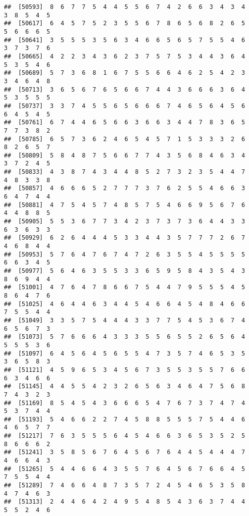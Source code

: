 \documentclass[
]{book}
\begin{document}
\begin{verbatim}
##  [50593]  8  6  7  7  5  4  4  5  5  6  7  4  2  6  6  3  4  3  4  3  8  5  4  5
##  [50617]  6  4  5  7  5  2  3  5  5  6  7  8  6  5  6  8  2  6  5  5  6  6  6  5
##  [50641]  3  5  5  5  3  5  6  3  4  6  6  5  6  5  7  5  5  4  6  3  7  3  7  6
##  [50665]  4  2  2  3  4  3  6  2  3  7  5  7  5  3  4  4  3  6  4  5  3  5  4  6
##  [50689]  5  7  3  6  8  1  6  7  5  5  6  6  4  6  2  5  4  2  3  3  4  6  4  8
##  [50713]  3  6  5  6  7  6  5  6  6  7  4  4  3  6  6  6  3  6  4  5  3  5  5  5
##  [50737]  3  3  7  4  5  5  6  5  6  6  6  7  4  6  5  6  4  5  6  6  4  5  4  5
##  [50761]  6  7  4  4  6  5  6  6  3  6  6  3  4  4  7  8  3  6  5  7  7  3  8  2
##  [50785]  6  5  7  3  6  2  4  6  5  4  5  7  1  5  3  3  3  2  6  8  2  6  5  7
##  [50809]  5  8  4  8  7  5  6  6  7  7  4  3  5  6  8  4  6  3  4  3  7  2  4  5
##  [50833]  4  3  8  7  4  3  4  4  8  5  2  7  3  2  3  5  4  4  7  4  8  3  3  8
##  [50857]  4  6  6  6  5  2  7  7  7  3  7  6  2  5  5  4  6  6  3  6  4  7  4  4
##  [50881]  4  7  5  4  5  7  4  8  5  7  5  4  6  6  9  5  6  7  6  4  4  8  8  5
##  [50905]  5  5  3  6  7  7  3  4  2  3  7  3  7  3  6  4  4  3  3  6  3  6  3  3
##  [50929]  6  2  6  4  4  4  5  3  3  4  4  3  5  7  7  7  2  6  7  4  6  8  4  4
##  [50953]  5  7  6  4  7  6  7  4  7  2  6  3  5  5  4  5  5  5  5  6  6  3  4  5
##  [50977]  5  6  4  6  3  5  5  3  3  6  5  9  5  8  4  3  5  4  3  8  6  9  4  4
##  [51001]  4  7  6  4  7  8  6  6  7  5  4  4  7  9  5  5  5  4  5  8  6  4  7  6
##  [51025]  4  6  4  4  6  3  4  4  5  4  6  6  4  5  4  8  4  6  6  7  5  5  4  4
##  [51049]  3  3  5  7  5  4  4  4  3  3  7  7  5  4  5  3  6  7  4  6  5  6  7  3
##  [51073]  5  7  6  6  6  4  3  3  3  5  5  6  5  5  2  6  5  6  4  5  5  5  3  6
##  [51097]  6  4  5  6  4  5  6  5  5  4  7  3  5  7  4  6  5  3  5  3  6  5  8  3
##  [51121]  4  5  9  6  5  3  4  5  6  7  3  5  5  3  5  5  7  6  6  6  3  4  6  6
##  [51145]  4  4  5  5  4  2  3  2  6  5  6  3  4  6  4  7  5  6  8  7  4  3  2  3
##  [51169]  8  5  4  5  4  3  6  6  6  5  4  7  6  7  3  7  4  7  4  5  3  7  4  4
##  [51193]  5  4  6  6  2  2  7  4  5  8  8  5  5  5  7  5  4  4  6  4  6  5  7  7
##  [51217]  7  6  3  5  5  5  6  4  5  4  6  6  3  6  5  3  5  2  5  8  6  6  6  2
##  [51241]  3  5  8  5  6  7  6  4  5  6  7  6  4  4  5  4  4  4  7  4  6  6  4  3
##  [51265]  5  4  4  6  6  4  3  5  5  7  6  4  5  6  7  6  6  4  5  7  5  5  4  4
##  [51289]  7  4  6  6  4  8  7  3  5  7  2  4  5  4  6  5  3  5  8  4  7  4  6  3
##  [51313]  2  4  4  6  4  2  4  9  5  4  8  5  4  3  6  3  7  4  4  5  5  2  4  6

\end{verbatim}
\end{document}
